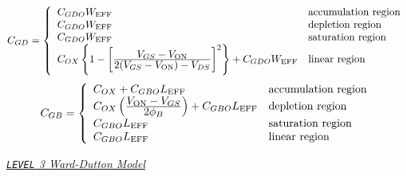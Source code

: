 \begin{equation}
C_{GD} =  \left\{ \begin{array}{ll}
            \CGDO\W_{\ms{EFF}}          & \mbox{accumulation region}\\
            \CGDO\W_{\ms{EFF}}          & \mbox{depletion region}\\
            \CGDO\W_{\ms{EFF}}  & \mbox{saturation region}\\
            C_{OX} \left\{ 1 - \left[
              {{\textstyle V_{GS} - V_{\ms{ON}}} \over
               {\textstyle 2(V_{GS}-V_{\ms{ON}}) - V_{DS}}} \right]^2\right\}
              + \CGDO\W_{\ms{EFF}}  & \mbox{linear region}
            \end{array}
            \right. %
\end{equation}
\begin{equation}
C_{GB} =  \left\{ \begin{array}{ll}
            C_{OX} + \CGBO L_{\ms{EFF}}        & \mbox{accumulation region}\\
            C_{OX} \left({{\textstyle V_{\ms{ON}}-V_{GS}}\over {\textstyle\PHI}}
                   \right) + \CGBO L_{\ms{EFF}} & \mbox{depletion region}\\
            \CGBO L_{\ms{EFF}} & \mbox{saturation region}\\
            \CGBO L_{\ms{EFF}} & \mbox{linear region}
            \end{array}
            \right.%
\end{equation}
\vshift

\noindent\underline{\sl \large {\tt LEVEL} 3 Ward-Dutton Model}\\[0.1in]

